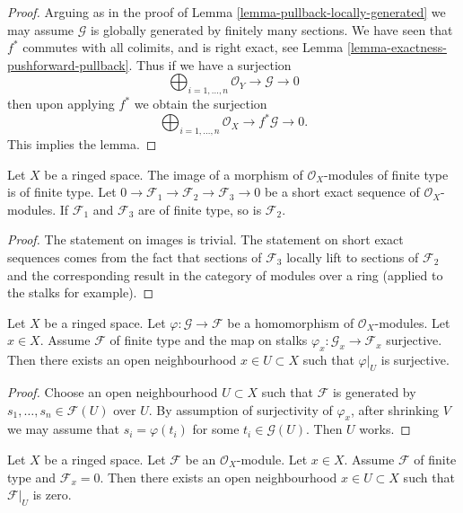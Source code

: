 \begin{proof}
Arguing as in the proof of Lemma \ref{lemma-pullback-locally-generated}
we may assume $\mathcal{G}$ is globally generated by finitely
many sections.
We have seen that $f^*$ commutes with all colimits,
and is right exact, see Lemma \ref{lemma-exactness-pushforward-pullback}.
Thus if we have a surjection
$$
\bigoplus\nolimits_{i = 1, \ldots, n}
\mathcal{O}_Y
\to
\mathcal{G}
\to
0
$$
then upon applying $f^*$ we obtain the surjection
$$
\bigoplus\nolimits_{i = 1, \ldots, n}
\mathcal{O}_X
\to
f^*\mathcal{G}
\to
0.
$$
This implies the lemma.
\end{proof}

\begin{lemma}
\label{lemma-extension-finite-type}
Let $X$ be a ringed space.
The image of a morphism of $\mathcal{O}_X$-modules of finite
type is of finite type.
Let
$0 \to \mathcal{F}_1 \to \mathcal{F}_2 \to \mathcal{F}_3 \to 0$
be a short exact sequence of $\mathcal{O}_X$-modules.
If $\mathcal{F}_1$ and $\mathcal{F}_3$ are of finite type,
so is $\mathcal{F}_2$.
\end{lemma}

\begin{proof}
The statement on images is trivial.
The statement on short exact sequences comes from the
fact that sections of $\mathcal{F}_3$ locally lift to sections
of $\mathcal{F}_2$ and the corresponding result in
the category of modules over a ring (applied to the stalks
for example).
\end{proof}

\begin{lemma}
\label{lemma-finite-type-surjective-on-stalk}
Let $X$ be a ringed space.
Let $\varphi : \mathcal{G} \to \mathcal{F}$ be a homomorphism
of $\mathcal{O}_X$-modules.
Let $x \in X$. Assume $\mathcal{F}$ of finite type and
the map on stalks
$\varphi_x : \mathcal{G}_x \to \mathcal{F}_x$ surjective.
Then there exists an open neighbourhood
$x \in U \subset X$ such that $\varphi|_U$ is surjective.
\end{lemma}

\begin{proof}
Choose an open neighbourhood $U \subset X$ such that $\mathcal{F}$ is
generated by $s_1, \ldots, s_n \in \mathcal{F}(U)$ over $U$.
By assumption of surjectivity of $\varphi_x$,
after shrinking $V$ we may assume that $s_i = \varphi(t_i)$
for some $t_i \in \mathcal{G}(U)$.
Then $U$ works.
\end{proof}

\begin{lemma}
\label{lemma-finite-type-stalk-zero}
Let $X$ be a ringed space.
Let $\mathcal{F}$ be an $\mathcal{O}_X$-module.
Let $x \in X$.
Assume $\mathcal{F}$ of finite type and $\mathcal{F}_x = 0$.
Then there exists an open neighbourhood
$x \in U \subset X$ such that $\mathcal{F}|_U$ is zero.
\end{lemma}

